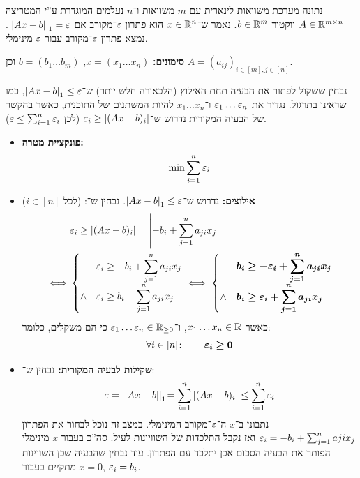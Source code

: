 \documentclass[]{../../../../tex/classes/homework}
\begin{document}
	\npage
	
	\section{}
	נתונה מערכת משוואות לינארית עם $m$ משוואות ו־$n$ נעלמים המוגדרת ע''י המטריצה $A \in \mathbb{R}^{m \times n}$ ווקטור $b \in \mathbb{R}^{m}$. נאמר ש־$x \in \mathbb{R}^{n}$ הוא פתרון $\eg$־מקורב אם $\norm{Ax - b}_1 = \eg$. נמצא פתרון $\eg$־מקורב עבור $\eg$ מינימלי. 
	
	\textbf{סימונים: }$x = (x_1 \dots x_n)$, $b = (b_1 \dots b_m)$ וכן $A = (a_{ij})_{i \in [m], j \in [n]}$. 
	
	נבחין ששקול לפתור את הבעיה תחת האילוץ (הלכאורה חלש יותר) ש־$\sof{Ax - b}_1 \le \eg$, כמו שראינו בתרגול. נגדיר את $\eg_1 \dots \eg_n$ ו־$x_1 \dots x_n$ להיות המשתנים של התוכנית, כאשר בהקשר של הבעיה המקורית נדרוש ש־$\eg_i \ge \sof{(Ax - b)_i}$ (לכן $\eg \le \sum_{i = 1}^{n} \eg_i$). 
	\begin{itemize}
		\item \textbf{פונקציית מטרה: }
		\[ \min \sum_{i = 1}^{n}\eg_i \]
		\item \textbf{אילוצים: }נדרוש ש־$\sof{Ax - b}_1 \le \eg$. נבחין ש־: (לכל $i \in [n]$)
			\begin{align*}
				& \eg_i \ge \sof{(Ax - b)_i} = \sof{-b_i + \sum_{j = 1}^{n}a_{ji}x_j} \\
				\iff & \begin{cases}
					&\disty {\eg_i \ge -b_i + \sum_{j = 1}^{n}a_{ji}x_j} \\
					\land & \disty {\eg_i \ge b_i - \sum_{j = 1}^{n}a_{ji}x_j}
				\end{cases} \iff \begin{cases}
					&\disty \bm{b_i \ge -\eg_i+ \sum_{j = 1}^{n}a_{ji}x_j} \\
					\land & \disty \bm{b_i \ge \eg_i + \sum_{j = 1}^{n}a_{ji}x_j}
				\end{cases}
			\end{align*}
			כאשר $x_1 \dots x_n \in \mathbb{R}$, ו־$\eg_1 \dots \eg_n \in \R_{\ge0}$ כי הם משקלים, כלומר: 
			\[ \forall i \in [n] \co \quad \quad \bm{\eg_i \ge 0} \]
		\item \textbf{שקילות לבעיה המקורית: }נבחין ש־: 
		\[ \eg = \norm{Ax - b}_1 \!= \sum_{i= 1}^{n}\sof{(Ax - b)_i} \le \sum_{i =1}^{n}\eg_i \]
		נתבונן ב־$x$ ה־$\eg$־מקורב המינימלי. במצב זה נוכל לבחור את הפתרון $\eg_i = -b_i + \sum_{j = 1}^{n}a{ji}x_j$ ואז נקבל התלכדות של השוויונות לעיל. סה''כ בעבור $x$ מינימלי הפותר את הבעיה הסכום אכן יתלכד עם הפתרון. עוד נבחין שהבעיה שכן השווינות מתקיים בעבור $x = 0$, $\eg_i = b_i$. 
	\end{itemize}
\end{document}
